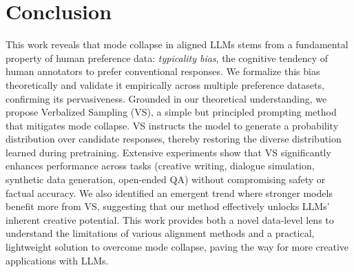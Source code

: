 \section{Conclusion}\label{sec:conclusion}



This work reveals that mode collapse in aligned LLMs stems from a fundamental property of human preference data: \textit{typicality bias}, the cognitive tendency of human annotators to prefer conventional responses. We formalize this bias theoretically and validate it empirically across multiple preference datasets, confirming its pervasiveness. Grounded in our theoretical understanding, we propose Verbalized Sampling (VS), a simple but principled prompting method that mitigates mode collapse. VS instructs the model to generate a probability distribution over candidate responses, thereby restoring the diverse distribution learned during pretraining. 
Extensive experiments show that VS significantly enhances performance across tasks (creative writing, dialogue simulation, synthetic data generation, open-ended QA) without compromising safety or factual accuracy. We also identified an emergent trend where stronger models benefit more from VS, suggesting that our method effectively unlocks LLMs' inherent creative potential. 
This work provides both a novel data-level lens to understand the limitations of various alignment methods and a practical, lightweight solution to overcome mode collapse, paving the way for more creative applications with LLMs.





